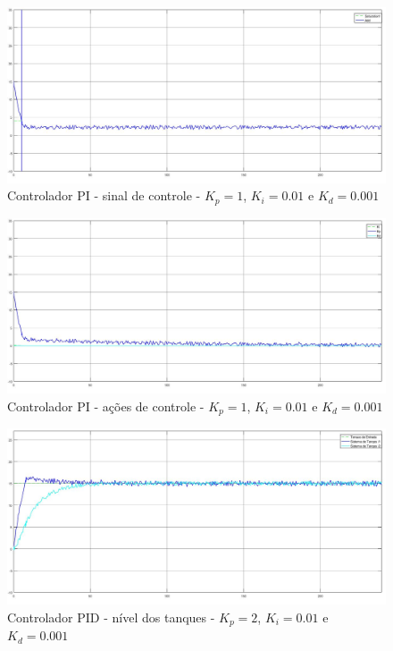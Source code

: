 \documentclass[
	12pt,				%
	openany,			%
	oneside,			%
	a4paper,			%
	english,			%
	french,				%
	spanish,			%
	brazil,				%
	]{abntex2}
\begin{document}
{\begin{figure}[h]
	\centering
	\includegraphics[scale=0.30]{4 - PDI sinal_controle.jpg}
	\caption{Controlador PI - sinal de controle - $K_p = 1$, $K_i = 0.01$ e $K_d=0.001$}
	\label{fig:sinal_controladorPID_1}
\end{figure}

\begin{figure}[h]
	\centering
	\includegraphics[scale=0.30]{4 - PDI acoes_controle.jpg}
	\caption{Controlador PI - ações de controle - $K_p = 1$, $K_i = 0.01$ e $K_d=0.001$}
	\label{fig:acao_controladorPID_1}
\end{figure}

\begin{figure}[h]
	\centering
	\includegraphics[scale=0.30]{6 - nivel_ PDI_2kp_01ki_0001kd.jpg}
	\caption{Controlador PID - nível dos tanques - $K_p = 2$, $K_i = 0.01$ e $K_d=0.001$}
	\label{fig:controladorPID_2}
\end{figure}

}
\end{document}
